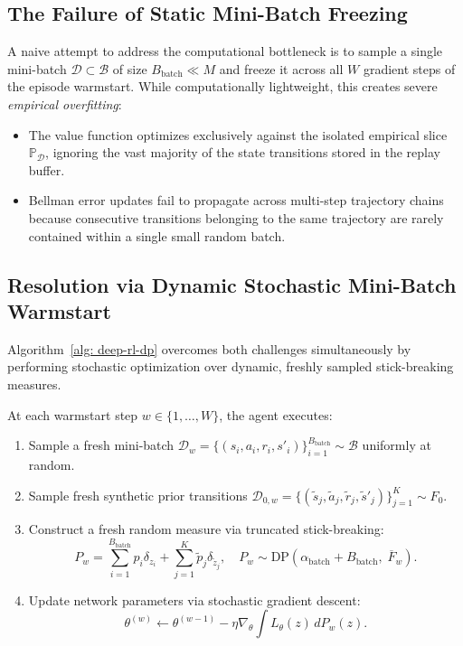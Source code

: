 \documentclass[10pt]{article}
\begin{document}
\subsection{The Failure of Static Mini-Batch Freezing}
A naive attempt to address the computational bottleneck is to sample a single mini-batch $\mathcal{D} \subset \mathcal{B}$ of size $B_{\text{batch}} \ll M$ and freeze it across all $W$ gradient steps of the episode warmstart. While computationally lightweight, this creates severe \textit{empirical overfitting}:
\begin{itemize}
    \item The value function optimizes exclusively against the isolated empirical slice $\mathbb{P}_{\mathcal{D}}$, ignoring the vast majority of the state transitions stored in the replay buffer.
    \item Bellman error updates fail to propagate across multi-step trajectory chains because consecutive transitions belonging to the same trajectory are rarely contained within a single small random batch.
\end{itemize}

\subsection{Resolution via Dynamic Stochastic Mini-Batch Warmstart}
Algorithm~\ref{alg: deep-rl-dp} overcomes both challenges simultaneously by performing stochastic optimization over dynamic, freshly sampled stick-breaking measures.

At each warmstart step $w \in \{1, \dots, W\}$, the agent executes:
\begin{enumerate}
    \item Sample a fresh mini-batch $\mathcal{D}_w = \{(s_i, a_i, r_i, s'_i)\}_{i=1}^{B_{\text{batch}}} \sim \mathcal{B}$ uniformly at random.
    \item Sample fresh synthetic prior transitions $\mathcal{D}_{0,w} = \{(\tilde{s}_j, \tilde{a}_j, \tilde{r}_j, \tilde{s}'_j)\}_{j=1}^K \sim F_0$.
    \item Construct a fresh random measure via truncated stick-breaking:
    \begin{equation}
    P_w = \sum_{i=1}^{B_{\text{batch}}} p_i \delta_{z_i} + \sum_{j=1}^K \tilde{p}_j \delta_{\tilde{z}_j}, \quad P_w \sim \text{DP}\left(\alpha_{\text{batch}} + B_{\text{batch}}, \; \overline{F}_w\right).
    \end{equation}
    \item Update network parameters via stochastic gradient descent:
    \begin{equation}
    \theta^{(w)} \leftarrow \theta^{(w-1)} - \eta \nabla_\theta \int L_\theta(z) \, dP_w(z).
    \end{equation}
\end{enumerate}
\end{document}
